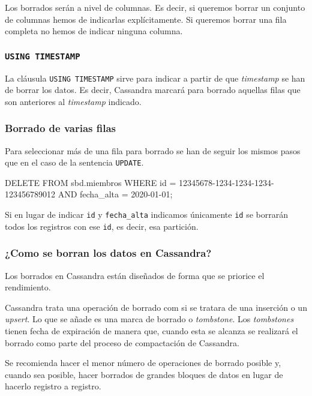 \documentclass[
]{book}
\newenvironment{Shaded}{}{}
\newcommand{\NormalTok}[1]{#1}
\begin{document}
Los borrados serán a nivel de columnas. Es decir, si queremos borrar un conjunto de columnas hemos de indicarlas explícitamente. Si queremos borrar una fila completa no hemos de indicar ninguna columna.

\subsubsection{\texorpdfstring{\texttt{USING\ TIMESTAMP}}{USING TIMESTAMP}}\label{using-timestamp}

La cláusula \texttt{USING\ TIMESTAMP} sirve para indicar a partir de que \emph{timestamp} se han de borrar los datos. Es decir, Cassandra marcará para borrado aquellas filas que son anteriores al \emph{timestamp} indicado.

\subsubsection{Borrado de varias filas}\label{borrado-de-varias-filas}

Para seleccionar más de una fila para borrado se han de seguir los mismos pasos que en el caso de la sentencia \texttt{UPDATE}.

\begin{Shaded}
\begin{Highlighting}[]
\NormalTok{DELETE FROM sbd.miembros}
\NormalTok{WHERE id = 12345678{-}1234{-}1234{-}1234{-}123456789012 AND fecha\_alta = \textquotesingle{}2020{-}01{-}01\textquotesingle{};}
\end{Highlighting}
\end{Shaded}

Si en lugar de indicar \texttt{id} y \texttt{fecha\_alta} indicamos únicamente \texttt{id} se borrarán todos los registros con ese \texttt{id}, es decir, esa partición.

\subsubsection{¿Como se borran los datos en Cassandra?}\label{como-se-borran-los-datos-en-cassandra}

Los borrados en Cassandra están diseñados de forma que se priorice el rendimiento.

Cassandra trata una operación de borrado com si se tratara de una inserción o un \emph{upsert}. Lo que se añade es una marca de borrado o \emph{tombstone}. Los \emph{tombstones} tienen fecha de expiración de manera que, cuando esta se alcanza se realizará el borrado como parte del proceso de compactación de Cassandra.

Se recomienda hacer el menor número de operaciones de borrado posible y, cuando sea posible, hacer borrados de grandes bloques de datos en lugar de hacerlo registro a registro.

\backmatter
\end{document}
